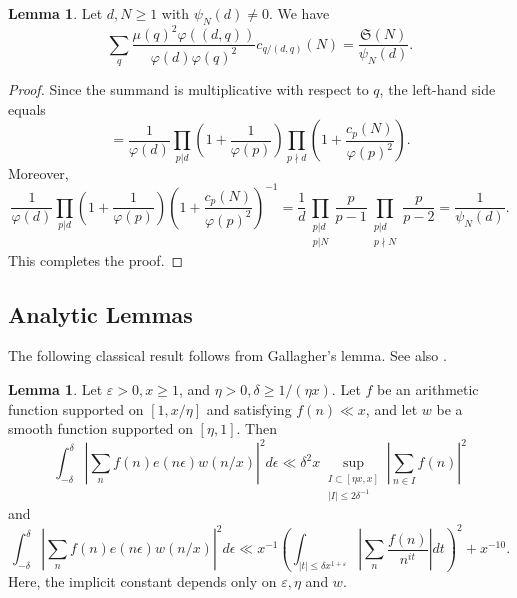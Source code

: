 \documentclass{amsart}
\theoremstyle{definition}
\newtheorem{lem}[dfn]{Lemma}
\theoremstyle{remark}
\newcommand{\1}{
    \bm{1}
}
\begin{document}
\begin{lem}\label{sing}
Let $d,N \geq 1$ with $\psi_N(d) \neq 0$. We have
\[ \sum_{q} \frac{\mu(q)^2 \varphi((d,q))}{\varphi(d) \varphi(q)^2} c_{q/(d,q)}(N) = \frac{\mathfrak{S}(N)}{\psi_N(d)} . \]
\end{lem}


\begin{proof}
Since the summand is multiplicative with respect to $q$, the left-hand side equals 
\[ = \frac{1}{\varphi(d)} \prod_{p|d} \left( 1 + \frac{1}{\varphi(p)} \right) \prod_{p \nmid d} \left( 1 + \frac{c_{p}(N)}{\varphi(p)^2} \right). \]
Moreover,
\[ \frac{1}{\varphi(d)} \prod_{p|d} \left( 1 + \frac{1}{\varphi(p)} \right)\left( 1 + \frac{c_{p}(N)}{\varphi(p)^2} \right)^{-1} = \frac{1}{d} \prod_{\substack{p|d \\ p|N}} \frac{p}{p-1} \prod_{\substack{p|d \\ p\nmid N}} \frac{p}{p-2} = \frac{1}{\psi_N(d)}. \]
This completes the proof.  
\end{proof}





\subsection{Analytic Lemmas}

The following classical result follows from Gallagher's lemma. See also \cite[Proposition 5.1]{matomaki2019correlations}. 
\begin{lem}\label{Gal}
Let $\varepsilon>0, x \geq 1$, and $\eta>0, \delta \geq 1/(\eta x)$. 
Let $f$ be an arithmetic function supported on $[1,x/\eta]$ and satisfying $f(n) \ll x$, and let $w$ be a smooth function supported on $[\eta,1]$. Then
\begin{equation}
\int_{-\delta}^{\delta} \left| \sum_{n} f(n) e(n\epsilon) w(n/x) \right|^2 d\epsilon \ll \delta^2 x \sup_{\substack{I \subset [\eta x,x] \\ |I| \leq 2\delta^{-1}}} \left| \sum_{n \in I} f(n) \right|^2 \label{Gal1}
\end{equation}
and
\begin{equation}
\int_{-\delta}^{\delta} \left| \sum_{n} f(n) e(n\epsilon) w(n/x) \right|^2 d\epsilon \ll x^{-1} \left( \int_{|t| \leq \delta x^{1+\varepsilon}} \left| \sum_{n} \frac{f(n)}{n^{it}} \right| dt \right)^2 + x^{-10}. \label{Gal2}
\end{equation}
Here, the implicit constant depends only on $\varepsilon,\eta$ and $w$. 
\end{lem}
\end{document}
